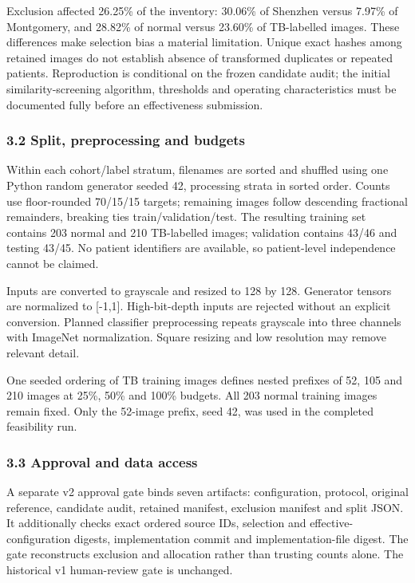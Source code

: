 \documentclass[
]{article}
\begin{document}
Exclusion affected 26.25\% of the inventory: 30.06\% of Shenzhen versus
7.97\% of Montgomery, and 28.82\% of normal versus 23.60\% of
TB-labelled images. These differences make selection bias a material
limitation. Unique exact hashes among retained images do not establish
absence of transformed duplicates or repeated patients. Reproduction is
conditional on the frozen candidate audit; the initial
similarity-screening algorithm, thresholds and operating characteristics
must be documented fully before an effectiveness submission.

\subsubsection{3.2 Split, preprocessing and
budgets}\label{split-preprocessing-and-budgets}

Within each cohort/label stratum, filenames are sorted and shuffled
using one Python random generator seeded 42, processing strata in sorted
order. Counts use floor-rounded 70/15/15 targets; remaining images
follow descending fractional remainders, breaking ties
train/validation/test. The resulting training set contains 203 normal
and 210 TB-labelled images; validation contains 43/46 and testing 43/45.
No patient identifiers are available, so patient-level independence
cannot be claimed.

Inputs are converted to grayscale and resized to 128 by 128. Generator
tensors are normalized to {[}-1,1{]}. High-bit-depth inputs are rejected
without an explicit conversion. Planned classifier preprocessing repeats
grayscale into three channels with ImageNet normalization. Square
resizing and low resolution may remove relevant detail.

One seeded ordering of TB training images defines nested prefixes of 52,
105 and 210 images at 25\%, 50\% and 100\% budgets. All 203 normal
training images remain fixed. Only the 52-image prefix, seed 42, was
used in the completed feasibility run.

\subsubsection{3.3 Approval and data
access}\label{approval-and-data-access}

A separate v2 approval gate binds seven artifacts: configuration,
protocol, original reference, candidate audit, retained manifest,
exclusion manifest and split JSON. It additionally checks exact ordered
source IDs, selection and effective-configuration digests,
implementation commit and implementation-file digest. The gate
reconstructs exclusion and allocation rather than trusting counts alone.
The historical v1 human-review gate is unchanged.
\end{document}
